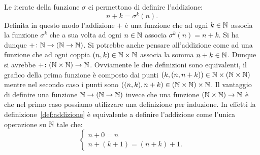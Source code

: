 Le iterate della funzione $\sigma$ ci permettono di definire l'addizione:
\begin{equation}\label{def:addizione}
  n+k = \sigma^k(n).  
\end{equation}
Definita in questo modo l'addizione $+$ è una funzione 
che ad ogni $k\in {\mathbb N}$ associa la funzione $\sigma^k$
che a sua volta ad ogni $n\in {\mathbb N}$ associa $\sigma^k(n)=n+k$.
Si ha dunque $+\colon {\mathbb N} \to ({\mathbb N}\to {\mathbb N})$.
Si potrebbe anche pensare all'addizione come ad una funzione 
che ad ogni coppia $(n,k)\in {\mathbb N}\times {\mathbb N}$ associa 
la somma $n+k\in {\mathbb N}$. Dunque si avrebbe $+\colon ({\mathbb N}\times {\mathbb N})\to {\mathbb N}$.
Ovviamente le due definizioni sono equivalenti, 
il grafico della prima funzione è composto dai punti 
$(k,(n,n+k))\in {\mathbb N}\times ({\mathbb N}\times {\mathbb N})$
mentre nel secondo caso i punti sono $((n,k),n+k)\in ({\mathbb N}\times {\mathbb N})\times {\mathbb N}$.
Il vantaggio di definire una funzione ${\mathbb N}\to({\mathbb N}\to{\mathbb N})$ invece che una 
funzione $({\mathbb N}\times{\mathbb N})\to{\mathbb N}$ è che nel primo caso possiamo utilizzare 
una definizione per induzione. 
In effetti la definizione~\eqref{def:addizione} è equivalente 
a definire l'addizione come l'unica operazione su ${\mathbb N}$ tale che:
\[
\begin{cases}
  n+0=n\\
  n+(k+1)=(n+k)+1.
\end{cases}  
\]

% 

